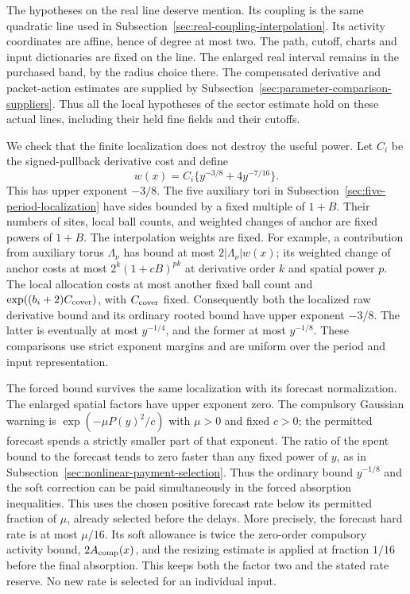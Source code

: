 The hypotheses on the real line deserve mention. Its coupling is the
same quadratic line used in Subsection~\ref{sec:real-coupling-interpolation}.
Its activity coordinates are affine, hence of degree at most two.
The path, cutoff, charts and input dictionaries are fixed on the line.
The enlarged real interval remains in the purchased band, by the
radius choice there. The compensated derivative and packet-action
estimates are supplied by Subsection~\ref{sec:parameter-comparison-suppliers}.
Thus all the local hypotheses of the sector estimate hold on these
actual lines, including their held fine fields and their cutoffs.

We check that the finite localization does not destroy the useful
power. Let $C_i$ be the signed-pullback derivative cost and define
\[
                  w(x)=C_i\{y^{-3/8}+4y^{-7/16}\}.
\]
This has upper exponent $-3/8$. The five auxiliary tori in
Subsection~\ref{sec:five-period-localization} have sides bounded by a
fixed multiple of $1+B$. Their numbers of sites, local ball counts,
and weighted changes of anchor are fixed powers of $1+B$.
The interpolation weights are fixed. For example, a contribution
from auxiliary torus $\Lambda_\nu$ has bound at most
$2|\Lambda_\nu|w(x)$; its weighted change of anchor costs at most
$2^k(1+cB)^{pk}$ at derivative order $k$ and spatial power $p$.
The local allocation costs at most another fixed ball count and
$\exp((b_i+2)C_{\rm cover})$, with $C_{\rm cover}$ fixed.
Consequently both the localized raw derivative bound and its
ordinary rooted bound have upper exponent $-3/8$.
The latter is eventually at most $y^{-1/4}$, and the former at most
$y^{-1/8}$. These comparisons use strict exponent margins and are
uniform over the period and input representation.

The forced bound survives the same localization with its forecast
normalization. The enlarged spatial factors have upper exponent zero.
The compulsory Gaussian warning is
$\exp(-\mu P(y)^2/c)$ with $\mu>0$ and fixed $c>0$; the permitted
forecast spends a strictly smaller part of that exponent. The ratio
of the spent bound to the forecast tends to zero faster than any
fixed power of $y$, as in
Subsection~\ref{sec:nonlinear-payment-selection}. Thus the ordinary
bound $y^{-1/8}$ and the soft correction can be paid simultaneously
in the forced absorption inequalities. This uses the chosen positive
forecast rate below its permitted fraction of $\mu$, already selected
before the delays. More precisely, the forecast hard rate is at most
$\mu/16$. Its soft allowance is twice the zero-order compulsory
activity bound, $2A_{\rm comp}(x)$, and the resizing estimate is
applied at fraction $1/16$ before the final absorption. This keeps
both the factor two and the stated rate reserve. No new rate is
selected for an individual input.

